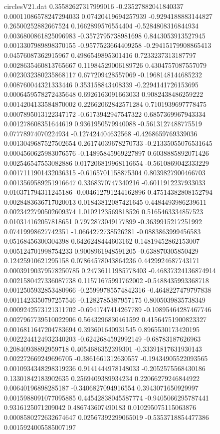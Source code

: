 \begin{filecontents}{circlesV21.dat}
0.35582627317999016	-0.23527882041840337	0.00011086578247294033
0.07420419694257939	-0.9294188883144827	0.26500252882667524
0.1662899576554404	-0.5284808316844934	0.0036800861825096983
-0.3572795738981698	0.8443053913527945	0.0013307989898370155
-0.9577523664409258	-0.29415179908865413	0.04576087362915967
0.4986549895301416	0.7233237313187797	0.0028635460813765667
0.11984529006189726	0.4304757087557079	0.0023032380235868117
0.677209428557069	-0.1968148144685232	0.008760044321333446
0.353158843408339	-0.2294141726153695	0.0006459578272435648
0.6926163091663033	0.9082438486259222	0.0014204133584870002
0.22662062842571284	0.7101939697778475	0.0007895013122347172
-0.6173942947547322	0.6857369967943334	0.001278608351644619
0.9361950579940088	-0.5613127488775519	0.07778974070224934
-0.127424404632568	-0.4268659769339036	0.0013049687527502654
0.26174039678270733	-0.21335055076531645	0.0004560625983076576
-0.14895845969227897	0.6038885892071426	0.002546547553082886
0.017206819968116654	-0.5610869042333229	0.0017111901432036315
-0.6165701158875304	0.8039827900466703	0.0013569589251916647
0.3368370747340216	-0.6011912237933033	0.010371794311245186
-0.004612791244162896	0.47514382808152794	0.0028483636717020013
0.01843812087421645	0.4484493986239611	0.0023422790502609374
1.0102123569818526	0.5165463334857523	0.010314162057818651
0.7972873049177899	-0.3639915217251992	0.07419998627742351
-1.0664272738526281	-0.0883863999456583	0.05168456300304398
0.6426248444603162	0.14819452862153007	0.005124701998754233
0.9008961948591205	-0.638870305850429	0.12425910621295158
0.07864578043864236	0.4429924687743171	0.00039190379578250785
0.24736111985778403	-0.46837324136874914	0.0021580427336087738
0.11571675991762002	-0.5488435993368718	0.0012505932853480966
-0.25999785574842316	-0.4648227479797838	0.0011423350797257546
-0.1282785387957175	0.8005039835738349	0.0009242573121311702
-0.6941747414267789	-0.10895464287467746	0.0027967739510022906
0.5643296830461592	0.41564751900823327	0.0016811647204783694
0.393601640931545	0.8965530173420195	0.0022244124932340203
-0.6242684592992149	-0.68783187626963	0.20840938892959718
0.4054686352399301	-0.33391817631930143	0.002272669249696705
-0.3861661312630557	-0.19434905522093565	0.0010934348298319236
0.9141444978148033	-0.2052575568430186	0.13301842183902635
0.2569409389934234	0.22066279246844922	0.00640196898285187
-0.3406827094916554	0.3943071650929997	0.0015988091077095885
0.44542838045587774	-0.9405066295787441	0.9316125071209042
0.486743607490183	0.010295075115063876	0.0008580272632674647
0.02567392299065019	-0.5353718854477386	0.0015924005585007197

\end{filecontents}
